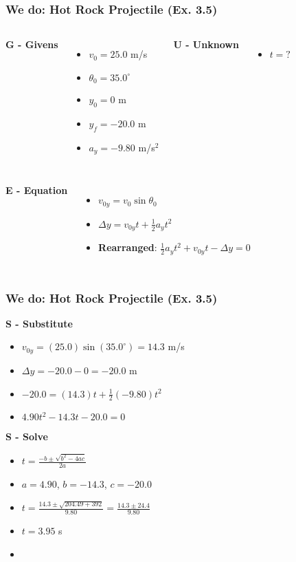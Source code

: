 \documentclass{beamer}
\begin{document}
\begin{frame}
\frametitle{We do: Hot Rock Projectile (Ex. 3.5)}
\pause
\begin{columns}[T]
\textbf{G - Givens}
\begin{itemize}
\item $v_0 = 25.0$ m/s
\item $\theta_0 = 35.0^\circ$
\item $y_0 = 0$ m
\item $y_f = -20.0$ m
\item $a_y = -9.80$ m/s$^2$
\end{itemize}
\pause
{}
\textbf{U - Unknown}
\begin{itemize}
\item $t = ?$
\end{itemize}
\end{columns}
\pause
\begin{columns}[T]
\textbf{E - Equation}
\begin{itemize}
\item $v_{0y} = v_0 \sin\theta_0$
\item $\Delta y = v_{0y}t + \frac{1}{2}a_y t^2$
\item \textbf{Rearranged}: $\frac{1}{2}a_y t^2 + v_{0y}t - \Delta y = 0$
\end{itemize}
\end{columns}
\end{frame}

\begin{frame}
\frametitle{We do: Hot Rock Projectile (Ex. 3.5)}

\textbf{S - Substitute}
\begin{itemize}
\item $v_{0y} = (25.0)\sin(35.0^\circ) = 14.3$ m/s
\item $\Delta y = -20.0 - 0 = -20.0$ m
\item $-20.0 = (14.3)t + \frac{1}{2}(-9.80)t^2$
\item $4.90t^2 - 14.3t - 20.0 = 0$
\end{itemize}
\pause
\textbf{S - Solve}
\begin{itemize}
\item $t = \frac{-b \pm \sqrt{b^2 - 4ac}}{2a}$
\item $a = 4.90$, $b = -14.3$, $c = -20.0$
\item $t = \frac{14.3 \pm \sqrt{204.49 + 392}}{9.80} = \frac{14.3 \pm 24.4}{9.80}$
\item $t = 3.95$ s
\item {}
\end{itemize}
\end{frame}
\end{document}
